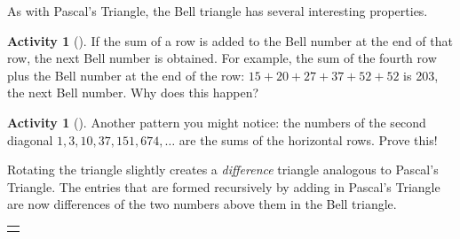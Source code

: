 \documentclass[10pt,]{book}
\theoremstyle{plain}
\theoremstyle{definition}
\theoremstyle{definition}
\theoremstyle{definition}
\newtheorem{activity}[project]{Activity}
\numberwithin{equation}{chapter}
\newlength{\panelmax}
\begin{document}
\hypertarget{p-1474}{}%
As with Pascal's Triangle, the Bell triangle has several interesting properties.%
\begin{activity}[]\label{activity-291}
\hypertarget{p-1475}{}%
If the sum of a row is added to the Bell number at the end of that row, the next Bell number is obtained. For example, the sum of the fourth row plus the Bell number at the end of the row: \(15 + 20 + 27 + 37 + 52 + 52\) is 203, the next Bell number.  Why does this happen?%
\end{activity}
\begin{activity}[]\label{activity-292}
\hypertarget{p-1476}{}%
Another pattern you might notice: the numbers of the second diagonal \(1, 3, 10, 37, 151, 674, \ldots\) are the sums of the horizontal rows.  Prove this!%
\end{activity}
\hypertarget{p-1477}{}%
Rotating the triangle slightly creates a \emph{difference} triangle analogous to Pascal's Triangle. The entries that are formed recursively by adding in Pascal's Triangle are now differences of the two numbers above them in the Bell triangle.%
{%
\setlength{\panelmax}{0pt}
\ifdefined\panelboxAtabular\else\newsavebox{\panelboxAtabular}\fi%
\ifdefined\phAtabular\else\newlength{\phAtabular}\fi%
\setlength{\phAtabular}{\ht\panelboxAtabular+\dp\panelboxAtabular}
\settototalheight{\phAtabular}{\usebox{\panelboxAtabular}}
\setlength{\panelmax}{\maxof{\panelmax}{\phAtabular}}
\leavevmode%
\setlength{\tabcolsep}{0\linewidth}
\par\medskip\noindent
\begin{tabular}{@{}*{1}{c}@{}}
\begin{minipage}[c][\panelmax][t]{1\linewidth}\usebox{\panelboxAtabular}\end{minipage}\end{tabular}\\
}%
\end{document}
